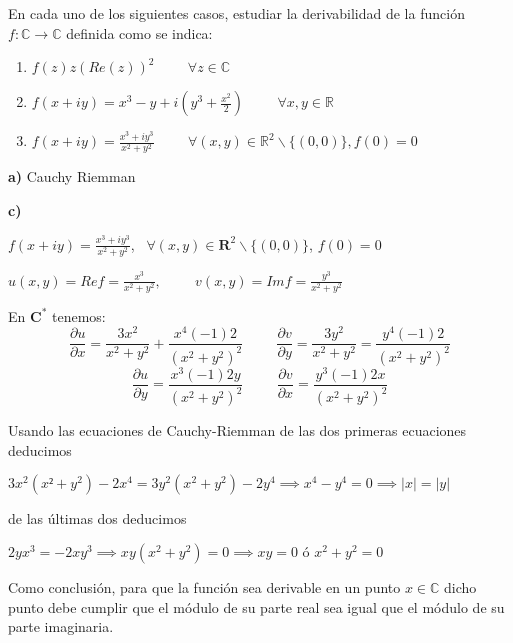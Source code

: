 \begin{ejer}
	En cada uno de los siguientes casos, estudiar la derivabilidad de la función $f:\mathbb{C} \rightarrow\mathbb{C}$ definida como se indica:
	\begin{enumerate}[label=(\alph*)]
		\item $f(z)  z(Re(z))^2 \hspace{1cm}\forall z\in\mathbb{C}$
		\item $f(x+iy) = x^3 -y+i\left( y^3 +\frac{x^2}{2} \right) \hspace{1cm} \forall x,y\in\mathbb{R}$
		\item $f(x+iy) = \frac{x^3+iy^3}{x^2+y^2} \hspace{1cm} \forall (x,y)\in\mathbb{R}^2\backslash\{(0,0)\}, f(0)=0$
	\end{enumerate}	
\end{ejer}

\textbf{a)}
Cauchy Riemman




\textbf{c)}

$f(x+iy) = \frac{x^3+iy^3}{x^2+y^2}$, \ $\forall (x,y)\in\mathbf{R}^2 \backslash \{ (0,0) \}$, $f(0)=0$

$u(x,y) = Re f = \frac{x^3}{x^2+y^2}, \hspace{1cm} v(x,y) = Imf = \frac{y^3}{x^2+y^2}$

En $\mathbf{C}^{\ast}$ tenemos:
$$ \frac{\partial u}{\partial x} = \frac{3x^2}{x^2+y^2} + \frac{x^4(-1)2}{(x^2+y^2)^2} \hspace{1cm}
\frac{\partial v}{\partial y} = \frac{3y^2}{x^2+y^2} = \frac{y^4(-1)2}{(x^2+y^2)^2}$$
$$ \frac{\partial u}{\partial y} = \frac{x^3 (-1)2y}{(x^2+y^2)^2} \hspace{1cm}
\frac{\partial v}{\partial x} = \frac{y^3(-1)2x}{(x^2+y^2)^2}$$

Usando las ecuaciones de Cauchy-Riemman de las dos primeras ecuaciones deducimos

$3x^2(x²+y^2) - 2x^4 = 3y^2(x^2+y^2)-2y^4 \implies x^4-y^4 = 0 \implies |x|=|y|$ 

de las últimas dos deducimos

$2yx^3=-2xy^3 \implies xy(x^2+y^2) = 0 \implies xy=0 \text{ ó } x^2+y^2=0$

Como conclusión, para que la función sea derivable en un punto $x\in\mathbb{C}$ dicho punto debe cumplir que el módulo de su parte real sea igual que el módulo de su parte imaginaria.





